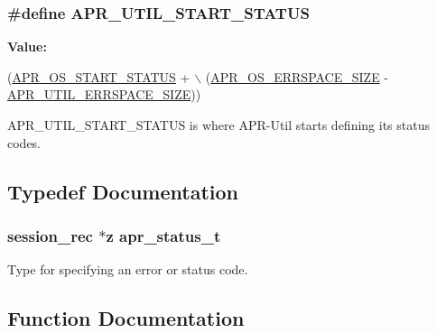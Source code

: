 \subsubsection[{\texorpdfstring{A\+P\+R\+\_\+\+U\+T\+I\+L\+\_\+\+S\+T\+A\+R\+T\+\_\+\+S\+T\+A\+T\+US}{APR_UTIL_START_STATUS}}]{\setlength{\rightskip}{0pt plus 5cm}\#define A\+P\+R\+\_\+\+U\+T\+I\+L\+\_\+\+S\+T\+A\+R\+T\+\_\+\+S\+T\+A\+T\+US}\hypertarget{group__apr__errno_gadf26297a72afa0ea224e7097fe59a1cd}{}\label{group__apr__errno_gadf26297a72afa0ea224e7097fe59a1cd}
{\bfseries Value\+:}
\begin{DoxyCode}
(\hyperlink{group__apr__errno_ga450e1a5734732e092ddaa5b67414f69b}{APR\_OS\_START\_STATUS} + \(\backslash\)
                           (\hyperlink{group__apr__errno_gadb8d97e6836ccdc57b43b6119a5acccf}{APR\_OS\_ERRSPACE\_SIZE} - 
      \hyperlink{group__apr__errno_gaef5e79630739f24d1512d0d044c2bae7}{APR\_UTIL\_ERRSPACE\_SIZE}))
\end{DoxyCode}
A\+P\+R\+\_\+\+U\+T\+I\+L\+\_\+\+S\+T\+A\+R\+T\+\_\+\+S\+T\+A\+T\+US is where A\+P\+R-\/\+Util starts defining its status codes. 

\subsection{Typedef Documentation}
\subsubsection[{\texorpdfstring{apr\+\_\+status\+\_\+t}{apr_status_t}}]{ {\bf session\+\_\+rec} $\ast$z {\bf apr\+\_\+status\+\_\+t}}\hypertarget{group__apr__errno_gaa5105fa83cc322f09382292db8b47593}{}\label{group__apr__errno_gaa5105fa83cc322f09382292db8b47593}
Type for specifying an error or status code. 

\subsection{Function Documentation}
